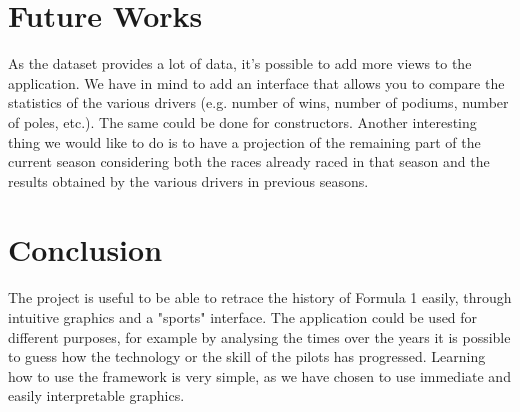\documentclass[11pt,twocolumn,letterpaper]{article}
\begin{document}
\section{Future Works}
As the dataset provides a lot of data, it's possible to add more views to the application. We have in mind to add an interface that allows you to compare the statistics of the various 
drivers (e.g. number of wins, number of podiums, number of poles, etc.). The same could be done for constructors. Another interesting thing we would like to do is to have a projection of the remaining part of the current season considering both the races already raced in that season and the results obtained by the various drivers in previous seasons.

\section{Conclusion}
The project is useful to be able to retrace the history of Formula 1 easily, through intuitive graphics and a "sports" interface. The application could be used for different purposes,
for example by analysing the times over the years it is possible to guess how the technology or the skill of the pilots has progressed.
Learning how to use the framework is very simple, as we have chosen to use immediate and easily interpretable graphics. 

\clearpage

\end{document}
